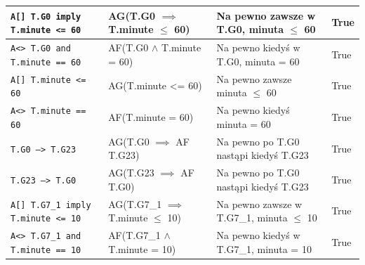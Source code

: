 \documentclass[12pt, a4paper]{article}
\begin{document}
\begin{landscape}
    \begin{table}
        \centering
        \begin{tabularx}{\linewidth}{X|X|X|l}
            \texttt{A[] T.G0 imply T.minute <= 60}                                          & AG(T.G0 $\implies$ T.minute $\le$ 60)                                                           & Na pewno zawsze w T.G0, minuta $\le$ 60                                   & True \\ \hline
            \texttt{A<> T.G0 and T.minute == 60}                                            & AF(T.G0 $ \wedge $ T.minute = 60)                                                               & Na pewno kiedyś w T.G0, minuta = 60                                       & True \\ \hline
            \texttt{A[] T.minute <= 60}                                                     & AG(T.minute <= 60)                                                                              & Na pewno zawsze minuta $\le$ 60                                           & True \\ \hline
            \texttt{A<> T.minute == 60}                                                     & AF(T.minute = 60)                                                                               & Na pewno kiedyś minuta = 60                                               & True \\ \hline
            \texttt{T.G0 --> T.G23}                                                         & AG(T.G0 $\implies$ AF T.G23)                                                                    & Na pewno po T.G0 nastąpi kiedyś T.G23                                     & True \\ \hline
            \texttt{T.G23 --> T.G0}                                                         & AG(T.G23 $\implies$ AF T.G0)                                                                    & Na pewno po T.G0 nastąpi kiedyś T.G23                                     & True \\ \hline
            \texttt{A[] T.G7\_1 imply T.minute <= 10}                                       & AG(T.G7\_1 $\implies$ T.minute $\le$ 10)                                                        & Na pewno zawsze w T.G7\_1, minuta $\le$ 10                                & True \\ \hline
            \texttt{A<> T.G7\_1 and T.minute == 10}                                         & AF(T.G7\_1 $ \wedge $ T.minute = 10)                                                            & Na pewno kiedyś w T.G7\_1, minuta = 10                                    & True \\ \hline

\end{tabularx}
\end{table}
\end{landscape}
\end{document}
